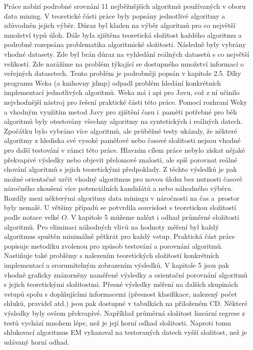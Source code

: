 \documentclass[12pt]{article}
\begin{document}
Práce nabízí podrobné srovnání 11 nejběžnějších algoritmů používaných v oboru data mining. V teoretické části práce byly popsány jednotlivé algoritmy a zdůvodněn jejich výběr. Důraz byl kladen na výběr algoritmů pro co největší množství typů úloh. Dále byla zjištěna teoretická složitost každého algoritmu a podrobně rozepsána problematika algoritmické složitosti. Následně byly vybrány vhodné datasety. Zde byl brán důraz na vyhledání reálných datasetů s co největší velikostí. Zde narážíme na problém týkající se dostupného množství informací o veřejných datasetech. Tento problém je podrobněji popsán v kapitole 2.5. 
\newline
\indent
Díky programu Weka (a knihovny jdmp) odpadl problém hledání konkrétních implementací jednotlivých algoritmů. Weka má i api pro Javu, což z ní učinilo nejvhodnější nástroj pro řešení praktické části této práce. Pomocí rozhraní Weky a vhodným využitím metod Javy pro zjištění času i~paměti potřebné pro běh algoritmů byly otestovány všechny algoritmy na syntetických i reálných datech. Zpočátku bylo vybráno více algoritmů, ale průběžné testy ukázaly, že některé algoritmy z hlediska své vysoké paměťové nebo časové složitosti nejsou vhodné pro další testování v rámci této práce.  
\newline
\indent
Hlavním cílem práce nebylo získat nějaké překvapivé výsledky nebo objevit přelomové znalosti, ale spíš porovnat reálné chování algoritmů s jejich teoretickými předpoklady. Z těchto výsledků je pak možné orientačně určit vhodný algoritmus pro novou úlohu bez nutnosti časově náročného zkoušení více potenciálních kandidátů a nebo náhodného výběru. 
\newline
\indent
Rozdíly mezi některými algoritmy data miningu v náročnosti na čas a~prostor byly nemalé. U většiny případů se potvrdila souvislost s teoretickou složitostí podle notace velké $O$. V kapitole 5 můžeme nalézt i odhad průměrné složitosti algoritmů. Pro eliminaci náhodných vlivů na hodnoty měření byl každý algoritmus spuštěn minimálně pětkrát pro každý vstup.
\newline
\indent
Praktická část práce popisuje metodiku zvolenou pro způsob testování a porovnání algoritmů. Nastiňuje také problémy s nalezením teoretických složitostí konkrétních implementací a srozumitelným zobrazením výsledků. 
\newline
\indent
V kapitole 5 jsou pak vhodně graficky znázorněny naměřené výsledky a orientační porovnání algoritmů s jejich teoretickými složitostmi. Přesné výsledky měření na dalších skupinách vstupů spolu s doplňujícími informacemi (přesnost klasifikace, nalezený počet shluků, pravidel atd.) jsou pak dostupné v tabulkách na přiloženém CD. Některé výsledky byly ovšem překvapivé. Například průměrná složitost lineární regrese z testů vychází mnohem lépe, než je její horní odhad složitosti. Naproti tomu shlukovací algoritmus EM vykazoval na testovaných datech vyšší složitost, než je udávaný horní odhad.
\end{document}
